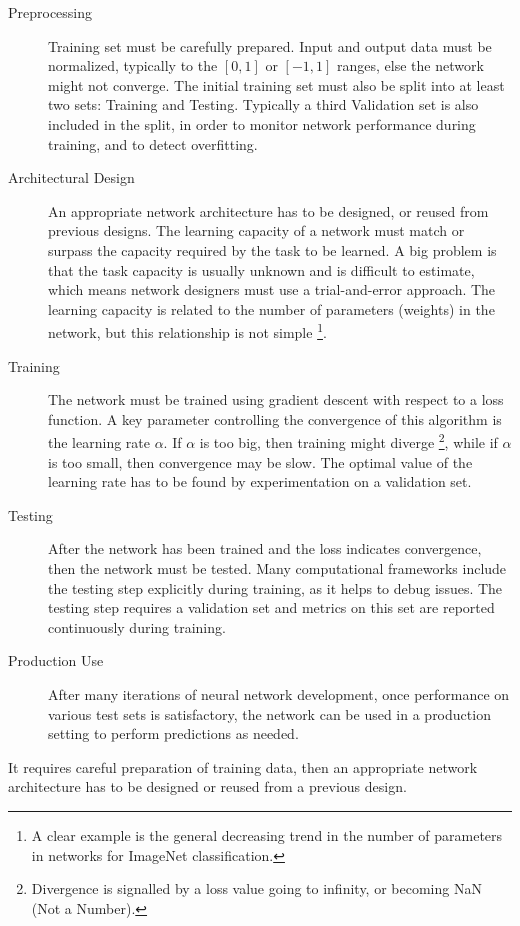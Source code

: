 \begin{description}
	\item[Preprocessing] Training set must be carefully prepared. Input and output data must be normalized, typically to the $[0,1]$ or $[-1, 1]$ ranges, else the network might not converge.
	The initial training set must also be split into at least two sets: Training and Testing. Typically a third Validation set is also included in the split, in order to monitor network performance during training, and to detect overfitting.
	\item[Architectural Design] An appropriate network architecture has to be designed, or reused from previous designs. The learning capacity of a network must match or surpass the capacity required by the task to be learned. A big problem is that the task capacity is usually unknown and is difficult to estimate, which means network designers must use a trial-and-error approach. The learning capacity is related to the number of parameters (weights) in the network, but this relationship is not simple \footnote{A clear example is the general decreasing trend in the number of parameters in networks for ImageNet classification.}.
	\item[Training] The network must be trained using gradient descent with respect to a loss function. A key parameter controlling the convergence of this algorithm is the learning rate $\alpha$. If $\alpha$ is too big, then training might diverge \footnote{Divergence is signalled by a loss value going to infinity, or becoming NaN (Not a Number).}, while if $\alpha$ is too small, then convergence may be slow. The optimal value of the learning rate has to be found by experimentation on a validation set.
	\item[Testing] After the network has been trained and the loss indicates convergence, then the network must be tested. Many computational frameworks include the testing step explicitly during training, as it helps to debug issues. The testing step requires a validation set and metrics on this set are reported continuously during training.
	\item[Production Use] After many iterations of neural network development, once performance on various test sets is satisfactory, the network can be used in a production setting to perform predictions as needed.
\end{description}


It requires careful preparation of training data, then an appropriate network architecture has to be designed or reused from a previous design. 

